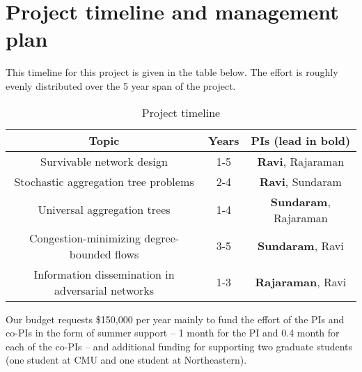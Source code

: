 \section{Project timeline and management plan}

This timeline for this project is given in the table below.  The
effort is roughly evenly distributed over the 5 year span of the
project.

\begin{table}
\begin{tabular}{||c|c|c||}
\hline\hline
{\bf Topic} & {\bf Years} & {\bf PIs (lead in bold)}\\\hline\hline
Survivable network design & 1-5 & {\bf Ravi}, Rajaraman\\\hline
Stochastic aggregation tree problems & 2-4 & {\bf Ravi}, Sundaram\\\hline
Universal aggregation trees  & 1-4 & {\bf Sundaram}, Rajaraman\\ \hline
Congestion-minimizing degree-bounded flows & 3-5 & {\bf Sundaram}, Ravi\\ \hline
Information dissemination in adversarial networks & 1-3 & {\bf Rajaraman}, Ravi\\ \hline
\end{tabular}
\caption{Project timeline}
\end{table}


Our budget requests \$150,000 per year mainly to fund the effort of
the PIs and co-PIs in the form of summer support -- 1 month for the PI
and 0.4 month for each of the co-PIs -- and additional funding for
supporting two graduate students (one student at CMU and one student
at Northeastern).  

